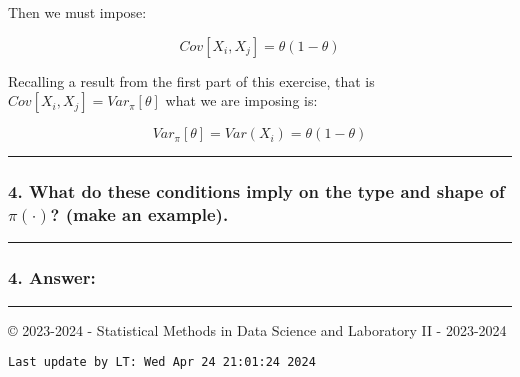 \documentclass[
]{article}
\begin{document}
Then we must impose:

\[
Cov[X_i, X_j] = \theta(1 - \theta)
\]

Recalling a result from the first part of this exercise, that is
\(Cov[X_i, X_j] = Var_\pi[\theta]\) what we are imposing is:

\[
Var_\pi[\theta] = Var(X_i) = \theta(1 - \theta)
\]

\begin{center}\rule{0.5\linewidth}{0.5pt}\end{center}

\hypertarget{what-do-these-conditions-imply-on-the-type-and-shape-of-picdot-make-an-example.}{%
\subsubsection{\texorpdfstring{4. What do these conditions imply on the
type and shape of \(\pi(\cdot)\)? (make an
example).}{4. What do these conditions imply on the type and shape of \textbackslash pi(\textbackslash cdot)? (make an example).}}\label{what-do-these-conditions-imply-on-the-type-and-shape-of-picdot-make-an-example.}}

\begin{center}\rule{0.5\linewidth}{0.5pt}\end{center}

\hypertarget{answer-13}{%
\subsubsection{4. Answer:}\label{answer-13}}

\vspace{10.5cm}

\begin{center}\rule{0.5\linewidth}{0.5pt}\end{center}

© 2023-2024 - Statistical Methods in Data Science and Laboratory II -
2023-2024

\begin{verbatim}
Last update by LT: Wed Apr 24 21:01:24 2024
\end{verbatim}
\end{document}

